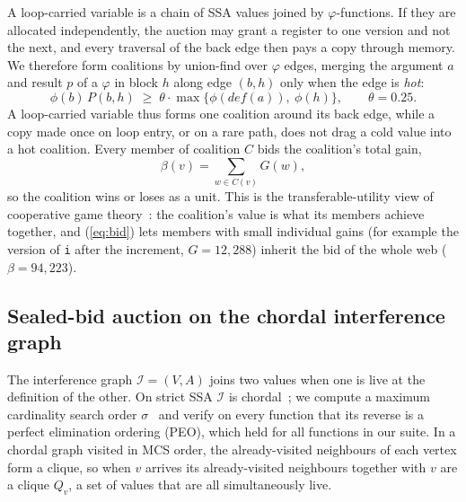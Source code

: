 \documentclass[conference]{IEEEtran}
\newcommand{\tm}[1]{\texttt{#1}}
\begin{document}
A loop-carried variable is a chain of SSA values joined by
$\varphi$-functions. If they are allocated independently, the auction
may grant a register to one version and not the next, and every
traversal of the back edge then pays a copy through memory. We
therefore form coalitions by union-find over $\varphi$ edges, merging
the argument $a$ and result $p$ of a $\varphi$ in block $h$ along edge
$(b,h)$ only when the edge is \emph{hot}:
\begin{equation}
\phi(b)\,P(b,h) \;\ge\; \theta\cdot\max\big\{\phi(\mathit{def}(a)),\ \phi(h)\big\},
\qquad \theta=0.25 .
\label{eq:hot}
\end{equation}
A loop-carried variable thus forms one coalition around its back edge,
while a copy made once on loop entry, or on a rare path, does not drag
a cold value into a hot coalition. Every member of coalition $C$ bids the
coalition's total gain,
\begin{equation}
\beta(v)=\sum_{w\in C(v)} G(w),
\label{eq:bid}
\end{equation}
so the coalition wins or loses as a unit. This is the transferable-utility
view of cooperative game theory~\cite{shapley1953}: the coalition's
value is what its members achieve together, and (\ref{eq:bid}) lets
members with small individual gains (for example the version of
\tm{i} after the increment, $G=12{,}288$) inherit the bid of the whole
web ($\beta=94{,}223$).

\subsection{Sealed-bid auction on the chordal interference graph}

The interference graph $\mathcal{I}=(V,A)$ joins two values when one is
live at the definition of the other. On strict SSA $\mathcal{I}$ is
chordal~\cite{hack2006ssa}; we compute a maximum cardinality search
order $\sigma$~\cite{tarjan1984} and verify on every function that its
reverse is a perfect elimination ordering (PEO), which held for all
functions in our suite. In a chordal graph visited in MCS order, the
already-visited neighbours of each vertex form a clique, so when $v$
arrives its already-visited neighbours together with $v$ are a clique
$Q_v$, a set of values that are all simultaneously live.
\end{document}
